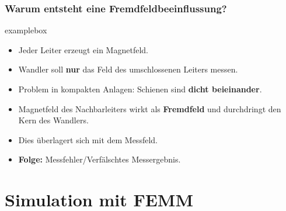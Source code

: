\begin{frame}
    \frametitle{Warum entsteht eine Fremdfeldbeeinflussung?}
    \begin{beamercolorbox}[wd=1\textwidth, sep=1ex, rounded=true, shadow=true]{examplebox}
        \begin{itemize}
            \item Jeder Leiter erzeugt ein Magnetfeld.
            \item Wandler soll \textbf{nur} das Feld des umschlossenen Leiters messen.
            \item Problem in kompakten Anlagen: Schienen sind \textbf{dicht beieinander}.
            \item Magnetfeld des Nachbarleiters wirkt als \textbf{Fremdfeld} und durchdringt den Kern des Wandlers.
            \item Dies überlagert sich mit dem Messfeld.
            \item \textbf{Folge:} Messfehler/Verfälschtes Messergebnis.
        \end{itemize}
    \end{beamercolorbox}
\end{frame}







\section*{Simulation mit FEMM}

